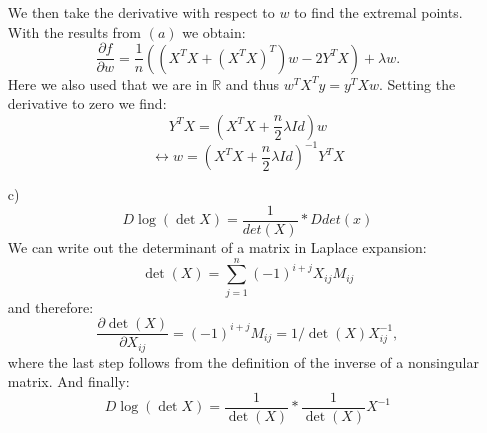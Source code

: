 \documentclass[10pt]{article}
\numberwithin{equation}{section}
\begin{document}
\begin{enumerate}
{$$$$
We then take the derivative with respect to $w$ to find the extremal points. With the results from $(a)$ we obtain:
$$
\frac{\partial f}{\partial w}=\frac{1}{n}( (X^TX + {(X^TX)}^T) w - 2Y^TX) + \lambda w.
$$
Here we also used that we are in $\mathbb{R}$ and thus $w^T X^Ty = y^TXw$. 
Setting the derivative to zero we find:
$$
Y^TX = \left( X^TX + \frac{n}{2}\lambda Id \right) w 
$$
$$
\leftrightarrow w = \left( X^TX + \frac{n}{2}\lambda Id \right)^{-1} Y^TX
$$}
\item[c)] {
$$D \log(\det{X}) = \frac{1}{det(X)} * D det(x)$$
We can write out the determinant of a matrix in Laplace expansion:
$$
\det(X)= \sum_{j=1}^n (-1)^{i+j} X_{ij} M_{ij}
$$
and therefore:
$$
\frac{\partial \det(X)}{\partial X_{ij}} = (-1)^{i+j} M_{ij} = 1/\det(X) X^{-1}_{ij},
$$
where the last step follows from the definition of the inverse of a nonsingular matrix. 
And finally:
$$
D \log(\det{X}) = \frac{1}{\det(X)} * \frac{1}{\det(X)} X^{-1}$$
}
\end{enumerate}
\end{document}
